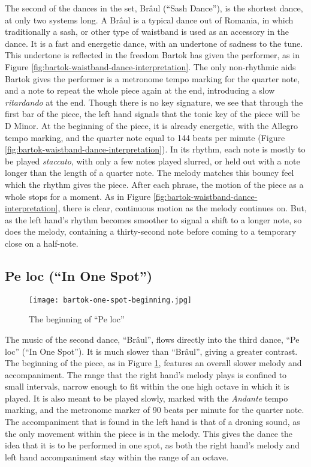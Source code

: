 The second of the dances in the set, Brâul (``Sash Dance''), is the shortest dance, at only two systems long. A Brâul is a typical dance out of Romania, in which traditionally a sash, or other type of waistband is used as an accessory in the dance. It is a fast and energetic dance, with an undertone of sadness to the tune. This undertone is reflected in the freedom Bartok has given the performer, as in Figure \ref{fig:bartok-waistband-dance-interpretation}\autocite{Lung_2016}. The only non-rhythmic aids Bartok gives the performer is a metronome tempo marking for the quarter note, and a note to repeat the whole piece again at the end, introducing a slow \textit{ritardando} at the end. Though there is no key signature, we see that through the first bar of the piece, the left hand signals that the tonic key of the piece will be D Minor. At the beginning of the piece, it is already energetic, with the Allegro tempo marking, and the quarter note equal to 144 beats per minute (Figure \ref{fig:bartok-waistband-dance-interpretation}\autocite{Lung_2016}). In its rhythm, each note is mostly to be played \textit{staccato}, with only a few notes played slurred, or held out with a note longer than the length of a quarter note. The melody matches this bouncy feel which the rhythm gives the piece. After each phrase, the motion of the piece as a whole stops for a moment. As in Figure \ref{fig:bartok-waistband-dance-interpretation}\autocite{Lung_2016}, there is clear, continuous motion as the melody continues on. But, as the left hand's rhythm becomes smoother to signal a shift to a longer note, so does the melody, containing a thirty-second note before coming to a temporary close on a half-note. 

\subsection{Pe loc (``In One Spot'')}

\begin{figure}
  \centering
  \texttt{[image: bartok-one-spot-beginning.jpg]}
  \caption[The beginning of ``Pe loc'', in Bartok's \textit{Six Romanian Folk Dances}, Sz. 56, BB 68]{The beginning of ``Pe loc''}  
  \label{fig:bartok-one-spot-beginning}
\end{figure}

The music of the second dance, ``Brâul'', flows directly into the third dance, ``Pe loc'' (``In One Spot''). It is much slower than ``Brâul'', giving a greater contrast. The beginning of the piece, as in Figure \ref{fig:bartok-one-spot-beginning}\autocite{Lung_2016}, features an overall slower melody and accompaniment. The range that the right hand's melody plays is confined to small intervals, narrow enough to fit within the one high octave in which it is played. It is also meant to be played slowly, marked with the \textit{Andante} tempo marking, and the metronome marker of 90 beats per minute for the quarter note. The accompaniment that is found in the left hand is that of a droning sound, as the only movement within the piece is in the melody. This gives the dance the idea that it is to be performed in one spot, as both the right hand's melody and left hand accompaniment stay within the range of an octave.

